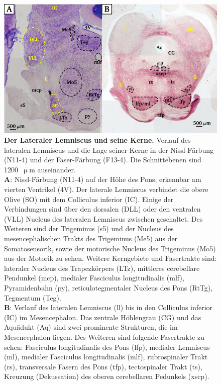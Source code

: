 \documentclass[12pt,a4paper,pdftex]{article}
\begin{document}
\begin{figure}[H]
    \centering
    \includegraphics[width = \textwidth]{pictures/auditory/lateral_lemniscus.png}
    \caption[Der Lateraler Lemniscus und seine Kerne]{\textbf{Der Lateraler Lemniscus und seine Kerne.} Verlauf des lateralen Lemniscus und die Lage seiner Kerne in der Nissl-Färbung (N11-4) und der Faser-Färbung (F13-4). Die Schnittebenen sind 1200~$\upmu$m auseinander.\\
    \textbf{A}: Nissl-Färbung (N11-4) auf der Höhe des Pons, erkennbar am vierten Ventrikel (4V).
    Der laterale Lemniscus verbindet die obere Olive (SO) mit dem Colliculus inferior (IC). Einige der Verbindungen sind über den dorsalen (DLL) oder den ventralen (VLL) Nucleus des lateralen Lemniscus zwischen geschaltet. 
    Des Weiteren sind der Trigeminus (s5) und der Nucleus des mesencephalischen Trakts des Trigeminus (Me5) aus der Somatosensorik, sowie der motorische Nucleus des Trigeminus (Mo5) aus der Motorik zu sehen. 
    Weitere Kerngebiete und Fasertrakte sind: lateraler Nucleus des Trapezkörpers (LTz), mittleres cerebellare Pendunkel (mcp), medialer Fasciculus longitudinalis (mlf), Pyramidenbahn (py), reticulotegmentaler Nucleus des Pons (RtTg), Tegmentum (Teg).\\
    \textbf{B}: Verlauf des lateralen Lemniscus (ll) bis in den Colliculus inferior (IC) im Mesencephalon. Das zentrale Höhlengrau (CG) und das Aquädukt (Aq) sind zwei prominente Strukturen, die im Mesencephalon liegen. Des Weiteren sind folgende Fasertrakte zu sehen: Fasciculus longitudinalis des Pons (lfp), medialer Lemniscus (ml), medialer Fasciculus longitudinalis (mlf), rubrospinaler Trakt (rs), transversale Fasern des Pons (tfp), tectospinaler Trakt (ts), Kreuzung (Dekussation) des oberen cerebellaren Pedunkels (xscp).}
    \label{fig:lateraler_lemniscus}
\end{figure}
\end{document}
